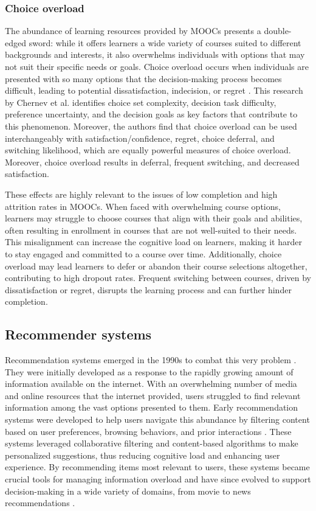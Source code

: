 \subsubsection{Choice overload}

The abundance of learning resources provided by MOOCs presents a double-edged sword: while it offers learners a wide variety of courses suited to different backgrounds and interests, it also overwhelms individuals with options that may not suit their specific needs or goals. Choice overload occurs when individuals are presented with so many options that the decision-making process becomes difficult, leading to potential dissatisfaction, indecision, or regret  \cite{chernev_choice_2015}. This research by Chernev et al. identifies choice set complexity, decision task difficulty, preference uncertainty, and the decision goals as key factors that contribute to this phenomenon. Moreover, the authors find that choice overload can be used interchangeably with satisfaction/confidence, regret, choice deferral, and switching likelihood, which are equally powerful measures of choice overload. Moreover, choice overload results in deferral, frequent switching, and decreased satisfaction. 

These effects are highly relevant to the issues of low completion and high attrition rates in MOOCs. When faced with overwhelming course options, learners may struggle to choose courses that align with their goals and abilities, often resulting in enrollment in courses that are not well-suited to their needs. This misalignment can increase the cognitive load on learners, making it harder to stay engaged and committed to a course over time. Additionally, choice overload may lead learners to defer or abandon their course selections altogether, contributing to high dropout rates. Frequent switching between courses, driven by dissatisfaction or regret, disrupts the learning process and can further hinder completion.

\subsection{Recommender systems} 

Recommendation systems emerged in the 1990s to combat this very problem \cite{goldberg_using_1992}. They were initially developed as a response to the rapidly growing amount of information available on the internet. With an overwhelming number of media and online resources that the internet provided, users struggled to find relevant information among the vast options presented to them. Early recommendation systems were developed to help users navigate this abundance by filtering content based on user preferences, browsing behaviors, and prior interactions \cite{lutz_mafiaactive_1990}. These systems leveraged collaborative filtering and content-based algorithms to make personalized suggestions, thus reducing cognitive load and enhancing user experience. By recommending items most relevant to users, these systems became crucial tools for managing information overload and have since evolved to support decision-making in a wide variety of domains, from movie \cite{dong_brief_2022} to news recommendations \cite{resnick_grouplens_1994}.

